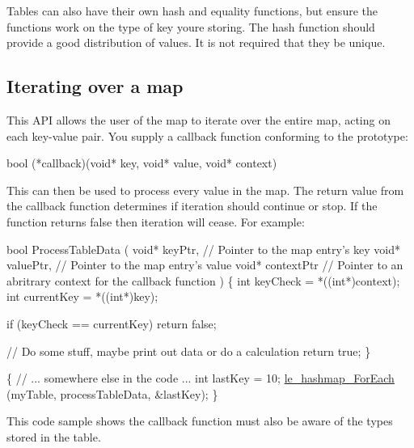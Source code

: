 Tables can also have their own hash and equality functions, but ensure the functions work on the type of key you\textquotesingle{}re storing. The hash function should provide a good distribution of values. It is not required that they be unique.\hypertarget{c_hashmap_c_hashmap_iterating}{}\subsection{Iterating over a map}\label{c_hashmap_c_hashmap_iterating}
This A\+P\+I allows the user of the map to iterate over the entire map, acting on each key-\/value pair. You supply a callback function conforming to the prototype\+: 
\begin{DoxyCode}
bool (*callback)(\textcolor{keywordtype}{void}* key, \textcolor{keywordtype}{void}* value, \textcolor{keywordtype}{void}* context)
\end{DoxyCode}


This can then be used to process every value in the map. The return value from the callback function determines if iteration should continue or stop. If the function returns false then iteration will cease. For example\+:


\begin{DoxyCode}
\textcolor{keywordtype}{bool} ProcessTableData
(
    \textcolor{keywordtype}{void}* keyPtr,     \textcolor{comment}{// Pointer to the map entry's key}
    \textcolor{keywordtype}{void}* valuePtr,   \textcolor{comment}{// Pointer to the map entry's value}
    \textcolor{keywordtype}{void}* contextPtr  \textcolor{comment}{// Pointer to an abritrary context for the callback function}
)
\{
    \textcolor{keywordtype}{int} keyCheck = *((\textcolor{keywordtype}{int}*)context);
    \textcolor{keywordtype}{int} currentKey = *((\textcolor{keywordtype}{int}*)key);

    \textcolor{keywordflow}{if} (keyCheck == currentKey) \textcolor{keywordflow}{return} \textcolor{keyword}{false};

    \textcolor{comment}{// Do some stuff, maybe print out data or do a calculation}
    \textcolor{keywordflow}{return} \textcolor{keyword}{true};
\}

\{
    \textcolor{comment}{// ... somewhere else in the code ...}
    \textcolor{keywordtype}{int} lastKey = 10;
    \hyperlink{le__hashmap_8h_a2fc335fffcf59a677ac2ac4e5733cdda}{le\_hashmap\_ForEach} (myTable, processTableData, &lastKey);
\}
\end{DoxyCode}


This code sample shows the callback function must also be aware of the types stored in the table.

